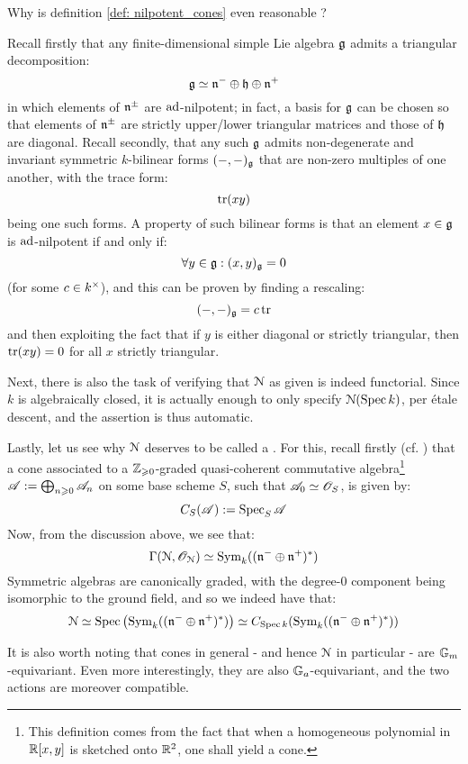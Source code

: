             \begin{remark}
                Why is definition \ref{def: nilpotent_cones} even reasonable ?

                Recall firstly that any finite-dimensional simple Lie algebra $\mathfrak{g}$ admits a triangular decomposition:
                    $$\mathfrak{g} \simeq \mathfrak{n}^- \oplus \mathfrak{h} \oplus \mathfrak{n}^+$$
                in which elements of $\mathfrak{n}^{\pm}$ are $\mathrm{ad}$-nilpotent; in fact, a basis for $\mathfrak{g}$ can be chosen so that elements of $\mathfrak{n}^{\pm}$ are strictly upper/lower triangular matrices and those of $\mathfrak{h}$ are diagonal. Recall secondly, that any such $\mathfrak{g}$ admits non-degenerate and invariant symmetric $k$-bilinear forms $(-, -)_{\mathfrak{g}}$ that are non-zero multiples of one another, with the trace form:
                    $$\operatorname{tr}(xy)$$
                being one such forms. A property of such bilinear forms is that an element $x \in \mathfrak{g}$ is $\mathrm{ad}$-nilpotent if and only if:
                    $$\forall y \in \mathfrak{g}: (x, y)_{\mathfrak{g}} = 0$$
                (for some $c \in k^{\x}$), and this can be proven by finding a rescaling:
                    $$(-, -)_{\mathfrak{g}} = c \operatorname{tr}$$
                and then exploiting the fact that if $y$ is either diagonal or strictly triangular, then $\operatorname{tr}(xy) = 0$ for all $x$ strictly triangular. 

                Next, there is also the task of verifying that $\mathcal{N}$ as given is indeed functorial. Since $k$ is algebraically closed, it is actually enough to only specify $\mathcal{N}(\operatorname{Spec} k)$, per \'etale descent, and the assertion is thus automatic.

                Lastly, let us see why $\mathcal{N}$ deserves to be called a . For this, recall firstly (cf. \cite[\href{https://stacks.math.columbia.edu/tag/062Q}{Tag 062Q}]{stacks}) that a cone associated to a $\mathbb{Z}_{\geqslant 0}$-graded quasi-coherent commutative algebra\footnote{This definition comes from the fact that when a homogeneous polynomial in $\mathbb{R}[x, y]$ is sketched onto $\mathbb{R}^2$, one shall yield a cone.} $\mathscr{A} := \bigoplus_{n \geqslant 0} \mathscr{A}_n$ on some base scheme $S$, such that $\mathscr{A}_0 \simeq \mathscr{O}_S$, is given by:
                    $$C_S(\mathscr{A}) := \operatorname{Spec}_S \mathscr{A}$$
                Now, from the discussion above, we see that:
                    $$\Gamma(\mathcal{N}, \mathscr{O}_{\mathcal{N}}) \simeq \mathrm{Sym}_k( (\mathfrak{n}^- \oplus \mathfrak{n}^+)^* )$$
                Symmetric algebras are canonically graded, with the degree-$0$ component being isomorphic to the ground field, and so we indeed have that:
                    $$\mathcal{N} \simeq \operatorname{Spec}\left( \mathrm{Sym}_k( (\mathfrak{n}^- \oplus \mathfrak{n}^+)^* ) \right) \simeq C_{\operatorname{Spec} k}( \mathrm{Sym}_k( (\mathfrak{n}^- \oplus \mathfrak{n}^+)^* ) )$$
            \end{remark}
            \begin{remark}
                It is also worth noting that cones in general - and hence $\mathcal{N}$ in particular - are $\mathbb{G}_m$-equivariant. Even more interestingly, they are also $\mathbb{G}_a$-equivariant, and the two actions are moreover compatible.
            \end{remark}

